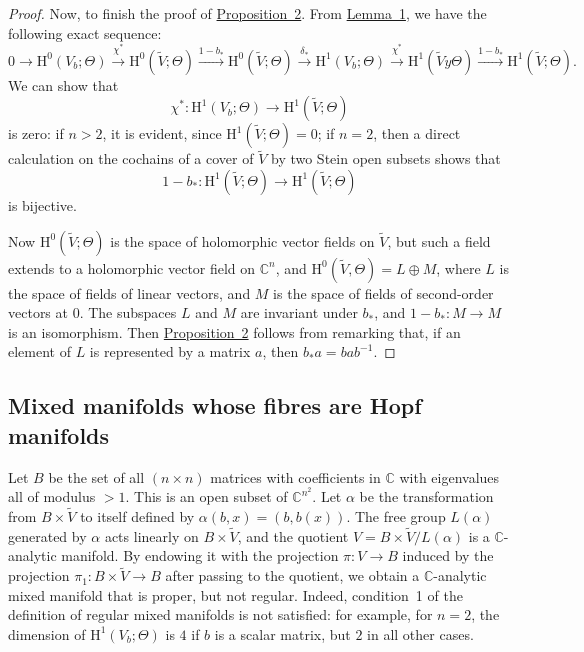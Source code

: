 \documentclass{article}
\newcommand{\CC}{\mathbb{C}}
\newcommand{\HH}{\mathrm{H}}
\newcommand{\oldpage}[1]{\marginpar{\footnotesize$\Big\vert$ \textit{p.~#1}}}
\begin{document}
\begin{proof}
  Now, to finish the proof of \hyperref[proposition2]{Proposition~2}.
  From \hyperref[lemma1]{Lemma~1}, we have the following exact sequence:
  \[
    0
    \to \HH^0(V_b;\Theta)
    \xrightarrow{\chi^*} \HH^0(\widetilde{V};\Theta)
    \xrightarrow{1-b_*} \HH^0(\widetilde{V};\Theta)
    \xrightarrow{\delta_*} \HH^1(V_b;\Theta)
    \xrightarrow{\chi^*} \HH^1(\widetilde{V}y\Theta)
    \xrightarrow{1-b_*} \HH^1(\widetilde{V};\Theta).
  \]
  We can show that
  \[
    \chi^*\colon \HH^1(V_b;\Theta) \to \HH^1(\widetilde{V};\Theta)
  \]
  is zero:
  if $n>2$, it is evident, since $\HH^1(\widetilde{V};\Theta)=0$;
  if $n=2$, then a direct calculation on the cochains of a cover of $\widetilde{V}$ by two Stein open subsets shows that
  \[
    1-b_*\colon \HH^1(\widetilde{V};\Theta) \to \HH^1(\widetilde{V};\Theta)
  \]
  is bijective.

  Now $\HH^0(\widetilde{V};\Theta)$ is the space of holomorphic vector fields on $\widetilde{V}$, but such a field extends to a holomorphic vector field on $\CC^n$, and $\HH^0(\widetilde{V},\Theta)=L\oplus M$, where $L$ is the space of fields of linear vectors, and $M$ is the space of fields of second-order vectors at $0$.
  The subspaces $L$ and $M$ are invariant under $b_*$, and $1-b_*\colon M\to M$ is an isomorphism.
  Then \hyperref[proposition2]{Proposition~2} follows from remarking that, if an element of $L$ is represented by a matrix $a$, then $b_*a=bab^{-1}$.
\end{proof}


\subsection{Mixed manifolds whose fibres are Hopf manifolds}
\label{III.2}

\oldpage{3-06}
Let $B$ be the set of all $(n\times n)$ matrices with coefficients in $\CC$ with eigenvalues all of modulus $>1$.
This is an open subset of $\CC^{n^2}$.
Let $\alpha$ be the transformation from $B\times\widetilde{V}$ to itself defined by $\alpha(b,x)=(b,b(x))$.
The free group $L(\alpha)$ generated by $\alpha$ acts linearly on $B\times\widetilde{V}$, and the quotient $V=B\times\widetilde{V}/L(\alpha)$ is a $\CC$-analytic manifold.
By endowing it with the projection $\pi\colon V\to B$ induced by the projection $\pi_1\colon B\times\widetilde{V}\to B$ after passing to the quotient, we obtain a $\CC$-analytic mixed manifold that is proper, but not regular.
Indeed, condition~1 of the definition of regular mixed manifolds is not satisfied: for example, for $n=2$, the dimension of $\HH^1(V_b;\Theta)$ is $4$ if $b$ is a scalar matrix, but $2$ in all other cases.
\end{document}
